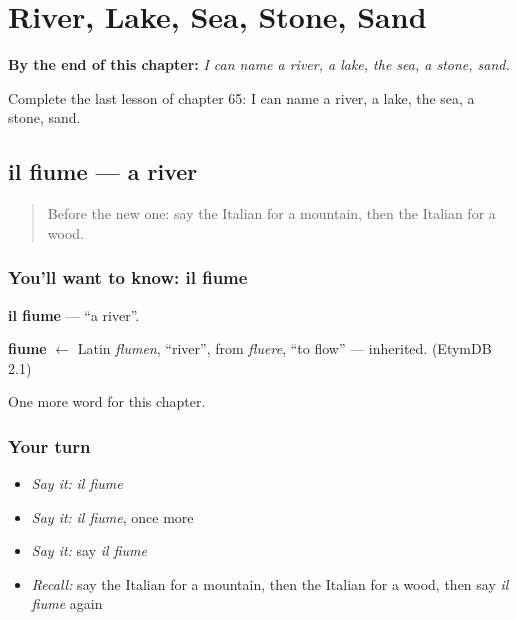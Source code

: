 
\chapter{River, Lake, Sea, Stone, Sand}
\label{ch:it-river-lake-sea-stone-sand}

\begin{chapteropening}
\textbf{By the end of this chapter:} \emph{I can name a river, a lake, the sea, a stone, sand.}

Complete the last lesson of chapter 65: I can name a river, a lake, the sea, a stone, sand.
\end{chapteropening}

\section[il fiume]{il fiume — a river}

\label{lesson:IT-C65-fiume}



\begin{quote}
Before the new one: say the Italian for a mountain, then the Italian for a wood.
\end{quote}

\subsection*{You'll want to know: il fiume}
\textbf{il fiume} — \textquotedblleft{}a river\textquotedblright{}.

\begin{cousinweb}
\textbf{fiume} $\leftarrow$ Latin \emph{flumen}, \textquotedblleft{}river\textquotedblright{}, from \emph{fluere}, \textquotedblleft{}to flow\textquotedblright{} — inherited. (EtymDB 2.1)
\end{cousinweb}

\begin{grammarlens}[title={What you've built}]
One more word for this chapter.
\end{grammarlens}

\subsection*{Your turn}
\begin{itemize}
\raggedright
  \item \emph{Say it:} \emph{il fiume}
  \item \emph{Say it:} \emph{il fiume}, once more
  \item \emph{Say it:} say \emph{il fiume}
  \item \emph{Recall:} say the Italian for a mountain, then the Italian for a wood, then say \emph{il fiume} again
\end{itemize}

